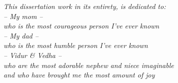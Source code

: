 \vspace*{1cm}
\begin{center}
\emph{This dissertation work in its entirety, is dedicated to:\\ -- My mom -- \\ who is the most courageous person I've ever known\\ -- My dad -- \\ who is the most humble person I've ever known\\ -- Vidur \& Vedha -- \\ who are the most adorable nephew and niece imaginable\\ and who have brought me the most amount of joy}
\end{center}
\vspace*{\fill}
